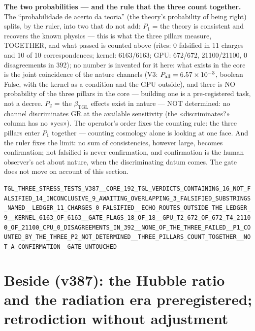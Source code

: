 \documentclass[11pt]{article}
\newcommand{\bTGL}{\beta_{\mathrm{TGL}}}\newcommand{\Msun}{M_{\odot}}\newcommand{\TGL}{\mathrm{TGL}}
\theoremstyle{definition}\newtheorem{deriv}{Derivation}
\begin{document}
\textbf{The two probabilities --- and the rule that the three count together.} The ``probabilidade de acerto da teoria'' (the theory's probability of being right) splits, by the ruler, into two that do not add: $P_1$ = the theory is consistent and recovers the known physics --- this is what the three pillars measure, TOGETHER, and what passed is counted above (rites: 0 falsified in 11 charges and 10 of 10 correspondences; kernel: 6163/6163; GPU: 672/672, 21100/21100, 0 disagreements in 392); no number is invented for it here: what exists in the core is the joint coincidence of the nature channels (V3: $P_{\rm all}=6.57\times10^{-3}$, boolean False, with the kernel as a condition and the GPU outside), and there is NO probability of the three pillars in the core --- building one is a pre-registered task, not a decree. $P_2$ = the $\bTGL$ effects exist in nature --- NOT determined: no channel discriminates GR at the available sensitivity (the «discriminates?» column has no «yes»). The operator's order fixes the counting rule: the three pillars enter $P_1$ together --- counting cosmology alone is looking at one face. And the ruler fixes the limit: no sum of consistencies, however large, becomes confirmation; not falsified is never confirmation, and confirmation is the human observer's act about nature, when the discriminating datum comes. The gate does not move on account of this section.

\begin{center}\small\texttt{TGL\_THREE\_STRESS\_TESTS\_V387\_\_CORE\_192\_TGL\_VERDICTS\_CONTAINING\_16\_NOT\_FALSIFIED\_14\_INCONCLUSIVE\_9\_AWAITING\_OVERLAPPING\_3\_FALSIFIED\_SUBSTRINGS\_NAMED\_\_LEDGER\_11\_CHARGES\_0\_FALSIFIED\_\_ECHO\_ROUTES\_OUTSIDE\_THE\_LEDGER\_9\_\_KERNEL\_6163\_OF\_6163\_\_GATE\_FLAGS\_18\_OF\_18\_\_GPU\_T2\_672\_OF\_672\_T4\_21100\_OF\_21100\_CPU\_0\_DISAGREEMENTS\_IN\_392\_\_NONE\_OF\_THE\_THREE\_FAILED\_\_P1\_COUNTED\_BY\_THE\_THREE\_P2\_NOT\_DETERMINED\_\_THREE\_PILLARS\_COUNT\_TOGETHER\_\_NOT\_A\_CONFIRMATION\_\_GATE\_UNTOUCHED}\end{center}

\section*{Beside (v387): the Hubble ratio and the radiation era preregistered; retrodiction without adjustment}

\end{document}
